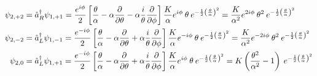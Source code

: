 \documentclass[12pt]{extarticle}
\begin{document}
\begin{align*}
\psi_{2, +2} &= \hat{a}^\dagger_R \psi_{1, +1} = \frac{e^{i \phi}}{2} \left[\frac{\theta}{\alpha}  - \alpha \frac{\partial{}}{\partial{\theta}} - \alpha \frac{i}{\theta} \frac{\partial{}}{\partial{\phi}}  \right] \frac{K}{\alpha} e^{i \phi} \: \theta \: e^{-\frac{1}{2} \left(\frac{\theta}{\alpha} \right)^2}  = \frac{K}{\alpha^2} e^{2 i \phi} \: \theta^2 \: e^{-\frac{1}{2} \left(\frac{\theta}{\alpha} \right)^2} \\
\psi_{2, -2} &= \hat{a}^\dagger_L \psi_{1, -1} = \frac{e^{-i \phi}}{2} \left[\frac{\theta}{\alpha}  - \alpha \frac{\partial{}}{\partial{\theta}} + \alpha \frac{i}{\theta} \frac{\partial{}}{\partial{\phi}}  \right]\frac{K}{\alpha} e^{-i \phi} \: \theta \: e^{-\frac{1}{2} \left(\frac{\theta}{\alpha} \right)^2} = \frac{K}{\alpha^2} e^{-2 i \phi} \: \theta^2 \: e^{-\frac{1}{2} \left(\frac{\theta}{\alpha} \right)^2} \\
\psi_{2, 0} &= \hat{a}^\dagger_L \psi_{1, +1} = \frac{e^{-i \phi}}{2} \left[\frac{\theta}{\alpha}  - \alpha \frac{\partial{}}{\partial{\theta}} + \alpha \frac{i}{\theta} \frac{\partial{}}{\partial{\phi}}  \right]\frac{K}{\alpha} e^{i \phi} \: \theta \: e^{-\frac{1}{2} \left(\frac{\theta}{\alpha} \right)^2} = K \left( \frac{\theta^2}{\alpha^2} - 1 \right) \: e^{-\frac{1}{2} \left(\frac{\theta}{\alpha} \right)^2}
\end{align*}
\end{document}

